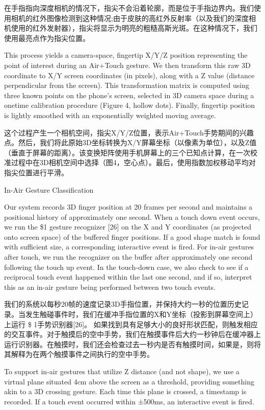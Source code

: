 在手指指向深度相机的情况下，指尖不会沿着轮廓，而是位于手指边界内。我们使用相机的红外图像检测到这种情况;由于皮肤的高红外反射率（以及我们的深度相机使用的红外发射器），指尖将显示为明亮的粗糙高斯光斑。在这种情况下，我们使用最亮点作为指尖位置。

This process yields a camera-space, fingertip X/Y/Z position representing the point of interest during an Air+Touch gesture. We then transform this raw 3D coordinate to X/Y screen coordinates (in pixels), along with a Z value (distance perpendicular from the screen). This transformation matrix is computed using three known points on the phone’s screen, selected in 3D camera space during a onetime calibration procedure (Figure 4, hollow dots). Finally, fingertip position is lightly smoothed with an exponentially weighted moving average. 

这个过程产生一个相机空间，指尖X/Y/Z位置，表示Air+Touch手势期间的兴趣点。然后，我们将此原始3D坐标转换为X/Y屏幕坐标（以像素为单位），以及Z值（垂直于屏幕的距离）。该变换矩阵使用手机屏幕上的三个已知点计算，在一次校准过程中在3D相机空间中选择（图4，空心点）。最后，使用指数加权移动平均对指尖位置进行平滑。

In-Air Gesture Classification

Our system records 3D finger position at 20 frames per second and maintains a positional history of approximately one second. When a touch down event occurs, we run the \$1 gesture recognizer [26] on the X and Y coordinates (as projected onto screen space) of the buffered finger positions.
If a good shape match is found with sufficient size, a corresponding interactive event is fired. For in-air gestures after touch, we run the recognizer on the buffer after approximately one second following the touch up event. In the touch-down case, we also check to see if a reciprocal touch
event happened within the last one second, and if so, interpret this as an in-air gesture being performed between two touch events.

我们的系统以每秒20帧的速度记录3D手指位置，并保持大约一秒的位置历史记录。当发生触碰事件时，我们在缓冲手指位置的X和Y坐标（投影到屏幕空间上）上运行 \$ 1手势识别器[26]。
如果找到具有足够大小的良好形状匹配，则触发相应的交互事件。对于触摸后的空中手势，我们在触摸事件后大约一秒钟后在缓冲器上运行识别器。在触摸时，我们还会检查过去一秒内是否有触摸时间，如果是，则将其解释为在两个触摸事件之间执行的空中手势。

To support in-air gestures that utilize Z distance (and not shape), we use a virtual plane situated 4cm above the screen as a threshold, providing something akin to a 3D crossing gesture. Each time this plane is crossed, a timestamp is recorded. If a touch event occurred within ±500ms, an interactive event is fired.

